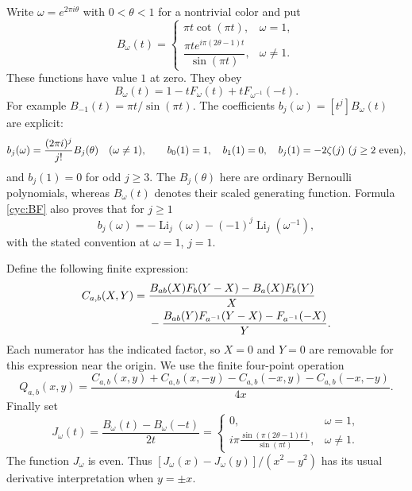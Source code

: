 Write $\omega=e^{2\pi i\theta}$ with $0<\theta<1$ for a nontrivial
color and put
\begin{equation}\label{cyc:B}
 B_\omega(t)=\begin{cases}
 \pi t\cot(\pi t),&\omega=1,\\[2pt]
 \dfrac{\pi t e^{i\pi(2\theta-1)t}}{\sin(\pi t)},&\omega\ne1.
 \end{cases}
\end{equation}
These functions have value $1$ at zero.  They obey
\begin{equation}\label{cyc:BF}
 B_\omega(t)=1-tF_\omega(t)+tF_{\omega^{-1}}(-t).
\end{equation}
For example $B_{-1}(t)=\pi t/\sin(\pi t)$.
The coefficients $b_j(\omega)=[t^j]B_\omega(t)$ are explicit:
\[
 b_j(\omega)=\frac{(2\pi i)^j}{j!}B_j(\theta)\quad(\omega\ne1),
 \qquad b_0(1)=1,\quad b_1(1)=0,
 \quad b_j(1)=-2\zeta(j)\ (j\ge2\hbox{ even}),
\]
and $b_j(1)=0$ for odd $j\ge3$.  The $B_j(\theta)$ here are ordinary
Bernoulli polynomials, whereas $B_\omega(t)$ denotes their scaled
generating function.  Formula \eqref{cyc:BF} also proves that for $j\ge1$
\[
 b_j(\omega)=-\operatorname{Li}_j(\omega)
                    -(-1)^j\operatorname{Li}_j(\omega^{-1}),
\]
with the stated convention at $\omega=1$, $j=1$.

Define the following finite expression:
\begin{align}\label{cyc:C}
 C_{a,b}(X,Y)={}&
 \frac{B_{ab}(X)F_b(Y-X)-B_a(X)F_b(Y)}X\notag\\
 &-\frac{B_{ab}(Y)F_{a^{-1}}(Y-X)-F_{a^{-1}}(-X)}Y.
\end{align}
Each numerator has the indicated factor, so $X=0$ and $Y=0$ are
removable for this expression near the origin.  We use the finite
four-point operation
\begin{equation}\label{cyc:Q}
 Q_{a,b}(x,y)=\frac{
 C_{a,b}(x,y)+C_{a,b}(x,-y)
 -C_{a,b}(-x,y)-C_{a,b}(-x,-y)}{4x}.
\end{equation}
Finally set
\begin{equation}\label{cyc:J}
 J_\omega(t)=\frac{B_\omega(t)-B_\omega(-t)}{2t}
 =\begin{cases}
 0,&\omega=1,\\[2pt]
 \displaystyle i\pi\frac{\sin(\pi(2\theta-1)t)}{\sin(\pi t)},
       &\omega\ne1.
 \end{cases}
\end{equation}
The function $J_\omega$ is even.  Thus
$[J_\omega(x)-J_\omega(y)]/(x^2-y^2)$ has its usual derivative
interpretation when $y=\pm x$.

